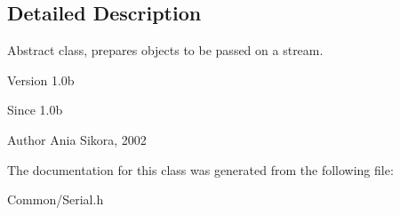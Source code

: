 \subsection{Detailed Description}
Abstract class, prepares objects to be passed on a stream. 

\begin{DoxyVersion}{Version}
1.\-0b 
\end{DoxyVersion}
\begin{DoxySince}{Since}
1.\-0b 
\end{DoxySince}
\begin{DoxyAuthor}{Author}
Ania Sikora, 2002 
\end{DoxyAuthor}


The documentation for this class was generated from the following file\-:\begin{DoxyCompactItemize}
\item 
Common/Serial.\-h\end{DoxyCompactItemize}
